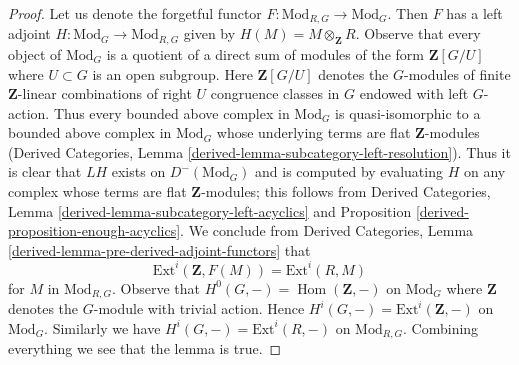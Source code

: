 \documentclass[10pt,a4paper]{amsart}
\theoremstyle{plain}
\theoremstyle{definition}
\theoremstyle{remark}
\numberwithin{equation}{subsection}
\def\Hom{\mathop{\mathrm{Hom}}\nolimits}
\begin{document}
\begin{proof}
Let us denote the forgetful functor $F : \text{Mod}_{R, G} \to \text{Mod}_G$.
Then $F$ has a left adjoint $H : \text{Mod}_G \to \text{Mod}_{R, G}$
given by $H(M) = M \otimes_\mathbf{Z} R$. Observe that every object of
$\text{Mod}_G$ is a quotient of a direct sum of modules of the form
$\mathbf{Z}[G/U]$ where $U \subset G$ is an open subgroup.
Here $\mathbf{Z}[G/U]$ denotes the $G$-modules of
finite $\mathbf{Z}$-linear combinations
of right $U$ congruence classes in $G$ endowed with left $G$-action.
Thus every bounded above complex in $\text{Mod}_G$ is quasi-isomorphic
to a bounded above complex in $\text{Mod}_G$ whose underlying
terms are flat $\mathbf{Z}$-modules
(Derived Categories, Lemma \ref{derived-lemma-subcategory-left-resolution}).
Thus it is clear that $LH$ exists on $D^-(\text{Mod}_G)$ and is computed by
evaluating $H$ on any complex whose terms are flat $\mathbf{Z}$-modules;
this follows from
Derived Categories, Lemma \ref{derived-lemma-subcategory-left-acyclics} and
Proposition \ref{derived-proposition-enough-acyclics}.
We conclude from Derived Categories, Lemma
\ref{derived-lemma-pre-derived-adjoint-functors}
that
$$
\text{Ext}^i(\mathbf{Z}, F(M)) = \text{Ext}^i(R, M)
$$
for $M$ in $\text{Mod}_{R, G}$.
Observe that $H^0(G, -) = \Hom(\mathbf{Z}, -)$ on
$\text{Mod}_G$ where $\mathbf{Z}$ denotes the $G$-module
with trivial action. Hence
$H^i(G, -) = \text{Ext}^i(\mathbf{Z}, -)$ on $\text{Mod}_G$.
Similarly we have $H^i(G, -) = \text{Ext}^i(R, -)$ on
$\text{Mod}_{R, G}$. Combining everything we see that the lemma is true.
\end{proof}
\end{document}
